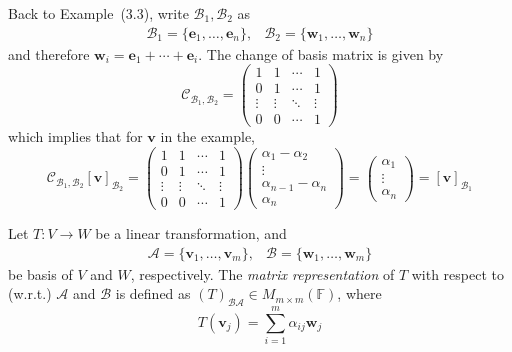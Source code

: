 \begin{example}
Back to Example~(3.3), write $\mathcal{B}_1,\mathcal{B}_2$ as
\[
\begin{array}{ll}
\mathcal{B}_1=\{\bm e_1,\dots,\bm e_n\},
&
\mathcal{B}_2=\{\bm w_1,\dots,\bm w_n\}
\end{array}
\]
and therefore $\bm w_i=\bm e_1+\cdots+\bm e_i$. The change of basis matrix is given by
\[
\mathcal{C}_{\mathcal{B}_1,\mathcal{B}_2}=
\begin{pmatrix}
1&1&\cdots&1\\
0&1&\cdots&1\\
\vdots&\vdots&\ddots&\vdots\\
0&0&\cdots&1
\end{pmatrix}
\]
which implies that for $\bm v$ in the example,
\[
\mathcal{C}_{\mathcal{B}_1,\mathcal{B}_2}[\bm v]_{\mathcal{B}_2}
=
\begin{pmatrix}
1&1&\cdots&1\\
0&1&\cdots&1\\
\vdots&\vdots&\ddots&\vdots\\
0&0&\cdots&1
\end{pmatrix}
\begin{pmatrix}
\alpha_1-\alpha_2\\\vdots\\\alpha_{n-1}-\alpha_n\\\alpha_n
\end{pmatrix}=\begin{pmatrix}
\alpha_1\\\vdots\\\alpha_n
\end{pmatrix}=[\bm v]_{\mathcal{B}_1}
\]
\end{example}

\begin{definition}
Let $T:V\to W$ be a linear transformation, and 
\[
\begin{array}{ll}
\mathcal{A}=\{\bm v_1,\dots,\bm v_m\},
&
\mathcal{B}=\{\bm w_1,\dots,\bm w_m\}
\end{array}
\]
be basis of $V$ and $W$, respectively. 
The \emph{matrix representation} of $T$ with respect to (w.r.t.) $\mathcal{A}$ and $\mathcal{B}$ is
defined as $(T)_{\mathcal{B}\mathcal{A}}\in M_{m\times m}(\mathbb{F})$, where
\[
T(\bm v_j)=\sum_{i=1}^m\alpha_{ij}\bm w_j
\]
\end{definition}











